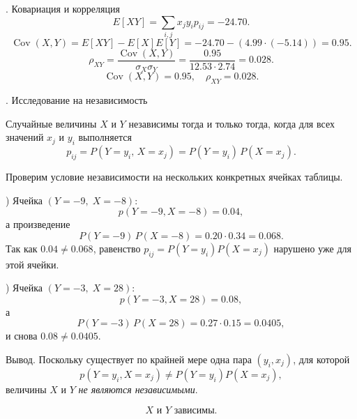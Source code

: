 \documentclass[a4paper,14pt]{extarticle}
\begin{document}
        . Ковариация и корреляция
        \[
        E[XY] = \sum_{i,j} x_j y_i p_{ij} = -24.70.
        \]
        \[
        \operatorname{Cov}(X,Y) = E[XY] - E[X]E[Y] = -24.70 - (4.99 \cdot (-5.14)) = 0.95.
        \]
        \[
        \rho_{XY} = \frac{\operatorname{Cov}(X,Y)}{\sigma_X \sigma_Y} = \frac{0.95}{12.53 \cdot 2.74} = 0.028.
        \]
        \[
        \boxed{\operatorname{Cov}(X,Y) = 0.95, \quad \rho_{XY} = 0.028.}
        \]

        . Исследование на независимость

        Случайные величины $X$ и $Y$ независимы тогда и только тогда, когда для всех значений $x_j$ и $y_i$ выполняется
        \[
        p_{ij}=P(Y=y_i,\,X=x_j)=P(Y=y_i)\,P(X=x_j).
        \]

        Проверим условие независимости на нескольких конкретных ячейках таблицы.

        ) Ячейка $(Y=-9,\;X=-8)$:
        \[
        p(Y=-9,X=-8)=0.04,
        \]
        а произведение
        \[
        P(Y=-9)\,P(X=-8)=0.20\cdot0.34=0.068.
        \]
        Так как \(0.04 \neq 0.068\), равенство \(p_{ij}=P(Y=y_i)P(X=x_j)\) нарушено уже для этой ячейки.

        ) Ячейка $(Y=-3,\;X=28)$:
        \[
        p(Y=-3,X=28)=0.08,
        \]
        а
        \[
        P(Y=-3)\,P(X=28)=0.27\cdot0.15=0.0405,
        \]
        и снова \(0.08 \neq 0.0405\).

        \noindent Вывод. Поскольку существует по крайней мере одна пара \((y_i,x_j)\), для которой
        \[
        p(Y=y_i,X=x_j)\neq P(Y=y_i)P(X=x_j),
        \]
        величины $X$ и $Y$ \emph{не являются независимыми}.

        \[
        \boxed{\text{$X$ и $Y$ зависимы.}}
        \]
        

            
\end{document}
